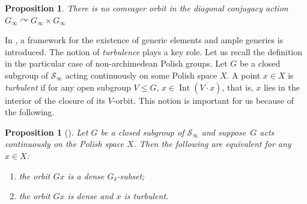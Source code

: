 \documentclass[JEP,XML,SOM,Unicode,NoFloatCountersInSection]{cedram}
\let\mathcal\mathscr
\theoremstyle{plain}
\newtheorem{prop}[thm]{Proposition}
\theoremstyle{definition}
\newcommand{\cS}{\mathcal{S}}
\newcommand{\sinf}{\cS_\infty}
\let\action\curvearrowright
\DeclareMathOperator{\Int}{Int}
\begin{document}
\begin{prop}\label{nco} There is no comeager orbit in the diagonal conjugacy action $G_\infty\action G_\infty\times G_\infty$
\end{prop}

In \cite[\S\S3 \& 6]{Kechris-Rosendal}, a framework for the existence of generic elements and ample generics is introduced. The notion of \emph{turbulence} plays a key role. Let us recall the definition in the particular case of non-archimedean Polish groups. Let $G$ be a closed subgroup of $\sinf$ acting continuously on some Polish space $X$. A point $x\in X$ is \emph{turbulent} if for any open subgroup $V\leq G$, $x\in \Int\left(\overline{V\cdot x}\right)$, that is, $x$ lies in the interior of the closure of its $V$-orbit. This notion is important for us because of the following.

\begin{prop}[{\cite[Prop.\,1.4]{Kechris-Rosendal}}]Let $G$ be a closed subgroup of $\sinf$ and suppose~$G$ acts continuously on the Polish space $X$. Then the following are equivalent for any $x\in X$:
\begin{enumerate}
\item the orbit $Gx$ is a dense $G_\delta$-subset;
\item the orbit $Gx$ is dense and $x$ is turbulent.
\end{enumerate}
\end{prop}
\end{document}
